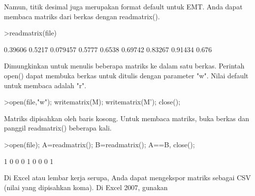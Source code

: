 \documentclass[a4paper,10pt]{article}
\begin{document}
\begin{eulernotebook}
\begin{eulercomment}
\begin{eulercomment}
\begin{eulercomment}
\begin{eulercomment}
\begin{eulercomment}
\begin{eulercomment}
\begin{eulercomment}
\begin{eulercomment}
\begin{eulercomment}
\begin{eulercomment}
\begin{eulercomment}
\begin{eulercomment}
\begin{eulercomment}
\begin{eulercomment}
\begin{eulercomment}
\begin{eulercomment}
\begin{eulercomment}
\begin{eulercomment}
\begin{eulercomment}
\begin{eulercomment}
\begin{eulercomment}
\begin{eulercomment}
\begin{eulercomment}
\begin{eulercomment}
\begin{eulercomment}
\begin{eulercomment}
\begin{eulercomment}
\begin{eulercomment}
\begin{eulercomment}
\begin{eulercomment}
\begin{eulercomment}
\begin{eulercomment}
\begin{eulercomment}
\begin{eulercomment}
\begin{eulercomment}
\begin{eulercomment}
\begin{eulercomment}
Namun, titik desimal juga merupakan format default untuk EMT. Anda
dapat membaca matriks dari berkas dengan readmatrix().
\end{eulercomment}
\begin{eulerprompt}
>readmatrix(file)
\end{eulerprompt}
\begin{euleroutput}
    0.39606    0.5217  0.079457 
     0.5777    0.6538   0.69742 
    0.83267   0.91434     0.676 
\end{euleroutput}
\begin{eulercomment}
Dimungkinkan untuk menulis beberapa matriks ke dalam satu berkas.
Perintah open() dapat membuka berkas untuk ditulis dengan parameter
"w". Nilai default untuk membaca adalah "r".
\end{eulercomment}
\begin{eulerprompt}
>open(file,"w"); writematrix(M); writematrix(M'); close();
\end{eulerprompt}
\begin{eulercomment}
Matriks dipisahkan oleh baris kosong. Untuk membaca matriks, buka
berkas dan panggil readmatrix() beberapa kali.
\end{eulercomment}
\begin{eulerprompt}
>open(file); A=readmatrix(); B=readmatrix(); A==B, close();
\end{eulerprompt}
\begin{euleroutput}
          1         0         0 
          0         1         0 
          0         0         1 
\end{euleroutput}
\begin{eulercomment}
Di Excel atau lembar kerja serupa, Anda dapat mengekspor matriks
sebagai CSV (nilai yang dipisahkan koma). Di Excel 2007, gunakan

\end{eulercomment}
\end{eulercomment}
\end{eulercomment}
\end{eulercomment}
\end{eulercomment}
\end{eulercomment}
\end{eulercomment}
\end{eulercomment}
\end{eulercomment}
\end{eulercomment}
\end{eulercomment}
\end{eulercomment}
\end{eulercomment}
\end{eulercomment}
\end{eulercomment}
\end{eulercomment}
\end{eulercomment}
\end{eulercomment}
\end{eulercomment}
\end{eulercomment}
\end{eulercomment}
\end{eulercomment}
\end{eulercomment}
\end{eulercomment}
\end{eulercomment}
\end{eulercomment}
\end{eulercomment}
\end{eulercomment}
\end{eulercomment}
\end{eulercomment}
\end{eulercomment}
\end{eulercomment}
\end{eulercomment}
\end{eulercomment}
\end{eulercomment}
\end{eulercomment}
\end{eulercomment}
\end{eulernotebook}
\end{document}
